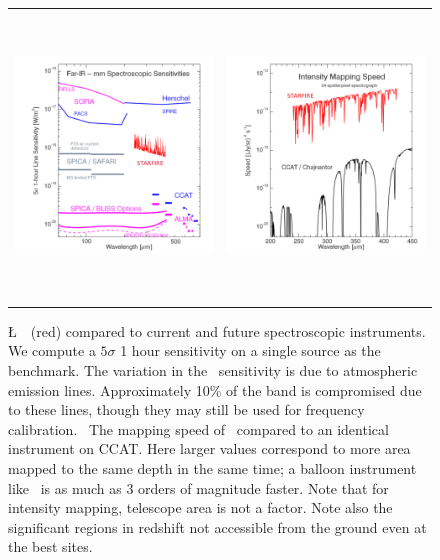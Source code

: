 \begin{figure}[h]
  \begin{tabular}{ll}
    \begin{minipage}{3.25in}
      \begin{center}
	\includegraphics[height=3in]{sensitivity_2012.pdf}
      \end{center}
    \end{minipage} &
    \begin{minipage}{3.25in}
      \begin{center}
	\includegraphics[height=3in]{icaris_nei.pdf}
      \end{center}
    \end{minipage}
  \end{tabular}
      \captionbaseline\caption{\small \L\ \name\ (red) compared to current and
	future spectroscopic instruments.  We compute a $5\sigma$ 1
	hour sensitivity on a single source as the benchmark. The
	variation in the \name\ sensitivity is due to atmospheric
	emission lines.  Approximately 10\% of the band is compromised
	due to these lines, though they may still be used for
	frequency calibration. \R\ The mapping speed of \name\
	compared to an identical instrument on CCAT.  Here larger
	values correspond to more area mapped to the same depth in the
	same time; a balloon instrument like \name\ is as much as 3 orders of magnitude
	faster.  Note that for intensity mapping, telescope area is
	not a factor.  Note also the significant regions in redshift
	not accessible from the ground even at the best sites.}
      \label{fig:SensCompare}
\end{figure}





















